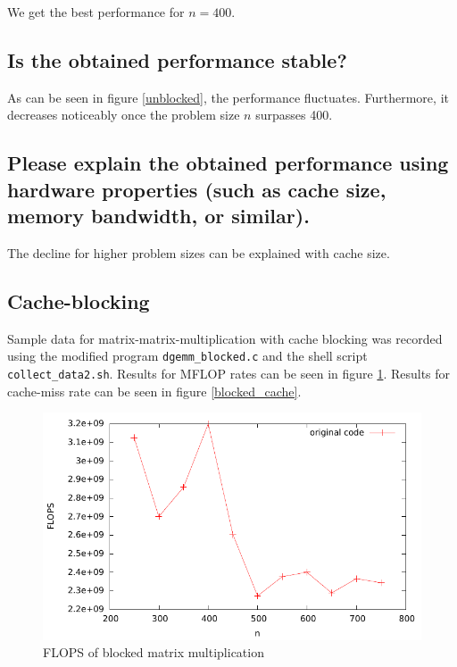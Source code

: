 \documentclass[11pt]{article}
\begin{document}
We get the best performance for $n = 400$.

\subsection*{Is the obtained performance stable?}

As can be seen in figure \ref{unblocked}, the performance fluctuates. Furthermore, it decreases noticeably once the problem size $n$ surpasses 400.

\subsection*{Please explain the obtained performance using hardware properties (such as cache size, memory bandwidth, or similar).}

The decline for higher problem sizes can be explained with cache size. %

\subsection*{Cache-blocking}
Sample data for matrix-matrix-multiplication with cache blocking was recorded using the modified program \texttt{dgemm\_blocked.c} and the shell script \texttt{collect\_data2.sh}. Results for MFLOP rates can be seen in figure \ref{blocked_flops}. Results for cache-miss rate can be seen in figure \ref{blocked_cache}. %

\begin{figure}[h]
  \begin{center}
    \includegraphics{../graphics/graph_unblocked.pdf}	%
    \caption{FLOPS of blocked matrix multiplication}
    \label{blocked_flops}
  \end{center}
\end{figure}
\end{document}
